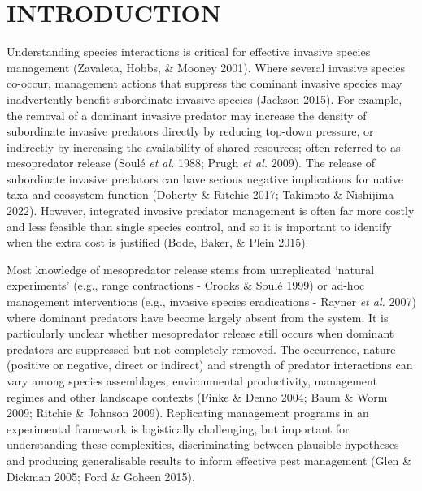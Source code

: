 \documentclass[preprint, 3p, authoryear]{elsarticle} %
\begin{document}
\hypertarget{introduction}{%
\section{INTRODUCTION}\label{introduction}}

Understanding species interactions is critical for effective invasive species management (Zavaleta, Hobbs, \& Mooney 2001). Where several invasive species co-occur, management actions that suppress the dominant invasive species may inadvertently benefit subordinate invasive species (Jackson 2015). For example, the removal of a dominant invasive predator may increase the density of subordinate invasive predators directly by reducing top-down pressure, or indirectly by increasing the availability of shared resources; often referred to as mesopredator release (Soulé \emph{et al.} 1988; Prugh \emph{et al.} 2009). The release of subordinate invasive predators can have serious negative implications for native taxa and ecosystem function (Doherty \& Ritchie 2017; Takimoto \& Nishijima 2022). However, integrated invasive predator management is often far more costly and less feasible than single species control, and so it is important to identify when the extra cost is justified (Bode, Baker, \& Plein 2015).

Most knowledge of mesopredator release stems from unreplicated `natural experiments' (e.g., range contractions - Crooks \& Soulé 1999) or ad-hoc management interventions (e.g., invasive species eradications - Rayner \emph{et al.} 2007) where dominant predators have become largely absent from the system. It is particularly unclear whether mesopredator release still occurs when dominant predators are suppressed but not completely removed. The occurrence, nature (positive or negative, direct or indirect) and strength of predator interactions can vary among species assemblages, environmental productivity, management regimes and other landscape contexts (Finke \& Denno 2004; Baum \& Worm 2009; Ritchie \& Johnson 2009). Replicating management programs in an experimental framework is logistically challenging, but important for understanding these complexities, discriminating between plausible hypotheses and producing generalisable results to inform effective pest management (Glen \& Dickman 2005; Ford \& Goheen 2015).
\end{document}
